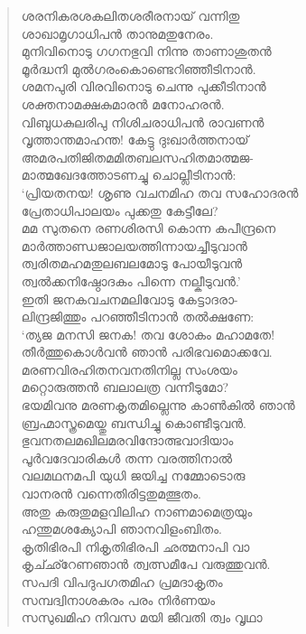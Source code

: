 \begin{verse}
ശരനികരശകലിതശരീരനായ് വന്നിതു\\
ശാഖാമൃഗാധിപന്‍ താനുമതുനേരം.\\
മുനിവിനൊടു ഗഗനഭുവി നിന്നു താണാശുതന്‍\\
മൂര്‍ദ്ധനി മുല്‍ഗരംകൊണ്ടെറിഞ്ഞീടിനാന്‍.\\
ശമനപുരി വിരവിനൊടു ചെന്നു പുക്കീടിനാന്‍\\
ശക്തനാമക്ഷകുമാരന്‍ മനോഹരന്‍.\\
വിബുധകുലരിപു നിശിചരാധിപന്‍ രാവണന്‍\\
വൃത്താന്തമാഹന്ത! കേട്ടു ദുഃഖാര്‍ത്തനായ്\\
അമരപതിജിതമമിതബലസഹിതമാത്മജ-\\
മാത്മഖേദത്തോടണച്ചു ചൊല്ലീടിനാന്‍:\\
‘പ്രിയതനയ! ശൃണു വചനമിഹ തവ സഹോദരന്‍\\
പ്രേതാധിപാലയം പുക്കതു കേട്ടീലേ?\\
മമ സുതനെ രണശിരസി കൊന്ന കപീന്ദ്രനെ\\
മാര്‍ത്താണ്ഡജാലയത്തിന്നായച്ചീടുവാന്‍\\
ത്വരിതമഹമതുലബലമോടു പോയീടുവന്‍\\
ത്വല്‍ക്കനിഷ്ഠോദകം പിന്നെ നല്കീടുവന്‍.’\\
ഇതി ജനകവചനമലിവോടു കേട്ടാദരാ-\\
ലിന്ദ്രജിത്തും പറഞ്ഞീടിനാന്‍ തല്‍ക്ഷണേ:\\
‘ത്യജ മനസി ജനക! തവ ശോകം മഹാമതേ!\\
തീര്‍ത്തുകൊള്‍വന്‍ ഞാന്‍ പരിഭവമൊക്കവേ.\\
മരണവിരഹിതനവനതിനില്ല സംശയം\\
മറ്റൊരുത്തന്‍ ബലാലത്ര വന്നീടുമോ?\\
ഭയമിവനു മരണകൃതമില്ലെന്നു കാണ്‍കില്‍ ഞാന്‍\\
ബ്രഹ്മാസ്ത്രമെയ്തു ബന്ധിച്ചു കൊണ്ടീടുവന്‍.\\
ഭുവനതലമഖിലമരവിന്ദോത്ഭവാദിയാം\\
പൂര്‍വദേവാരികള്‍ തന്ന വരത്തിനാല്‍\\
വലമഥനമപി യുധി ജയിച്ച നമ്മോടൊരു\\
വാനരന്‍ വന്നെതിരിട്ടതുമത്ഭുതം.\\
അതു കരുതുമളവിലിഹ നാണമാമെത്രയും\\
ഹന്തുമശക്യോപി ഞാനവിളംബിതം.\\
കൃതിഭിരപി നികൃതിഭിരപി ഛത്മനാപി വാ\\
കൃച്ഛ്റേണഞാന്‍ ത്വത്സമീപേ വരുത്തുവന്‍.\\
സപദി വിപദുപഗതമിഹ പ്രമദാകൃതം\\
സമ്പദ്വിനാശകരം പരം നിര്‍ണയം\\
സസുഖമിഹ നിവസ മയി ജീവതി ത്വം വൃഥാ\\

\end{verse}
